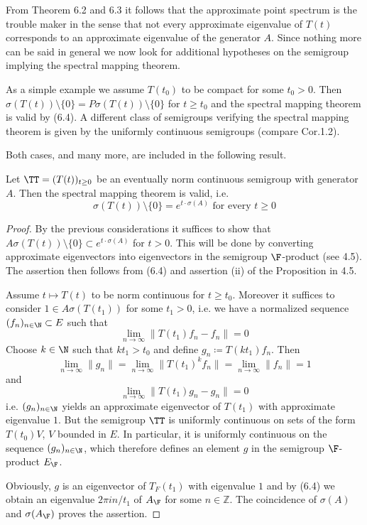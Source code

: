 From Theorem 6.2 and 6.3 it follows that the approximate point spectrum is the trouble maker in the sense that not every approximate eigenvalue of $T(t)$ corresponds to an approximate eigenvalue of the generator $A$.
Since nothing more can be said in general we now look for additional hypotheses on the semigroup implying the spectral mapping theorem.

As a simple example we assume $T(t_{0})$ to be compact for some $t_{0} > 0$.
Then $\sigma(T(t)) \setminus \{0\} = P\sigma(T(t)) \setminus \{0\}$ for $t \geq t_{0}$ and the spectral mapping theorem is valid by (6.4).
A different class of semigroups verifying the spectral mapping theorem is given by the uniformly continuous semigroups (compare Cor.1.2).

Both cases, and many more, are included in the following result.


\begin{theorem}\label{thm:a3-6.6}
Let $\TT = (T(t))_{t\geq 0}$ be an eventually norm continuous semigroup with generator $A$.
Then the spectral mapping theorem is valid, i.e.
\[
\sigma(T(t)) \setminus \{0\} = e^{t \cdot \sigma(A)} \text{ for every } t \geq 0
\]
\end{theorem}

\begin{proof}
By the previous considerations it suffices to show that $A\sigma(T(t)) \setminus \{0\} \subset e^{t \cdot \sigma(A)}$ for $t > 0$.
This will be done by converting approximate eigenvectors into eigenvectors in the semigroup $\F$-product (see 4.5).
The assertion then follows from (6.4) and assertion (ii) of the Proposition in 4.5.

Assume $t \mapsto T(t)$ to be norm continuous for $t \geq t_{0}$.
Moreover it suffices to consider $1 \in A\sigma(T(t_{1}))$ for some $t_{1} > 0$, i.e. we have a normalized sequence $(f_{n})_{n\in\N} \subset E$ such that
\[
\lim_{n\to\infty} \|T(t_{1})f_{n} - f_{n}\| = 0
\]
Choose $k \in \N$ such that $kt_{1} > t_{0}$ and define $g_{n} \coloneqq T(kt_{1})f_{n}$.
Then
\[
\lim_{n\to\infty}\|g_{n}\| = \lim_{n\to\infty}\|T(t_{1})^{k}f_{n}\| = \lim_{n\to\infty}\|f_{n}\| = 1
\]
and
\[
\lim_{n\to\infty} \|T(t_{1})g_{n} - g_{n}\| = 0
\]
i.e. $(g_{n})_{n\in\N}$ yields an approximate eigenvector of $T(t_{1})$ with approximate eigenvalue $1$.
But the semigroup $\TT$ is uniformly continuous on sets of the form $T(t_{0})V$, $V$ bounded in $E$.
In particular, it is uniformly continuous on the sequence $(g_{n})_{n\in\N}$, which therefore defines an element $g$ in the semigroup $\F$-product $E_{\F}$.

Obviously, $g$ is an eigenvector of $T_{F}(t_{1})$ with eigenvalue $1$ and by (6.4) we obtain an eigenvalue $2\pi i n/t_{1}$ of $A_{\F}$ for some $n \in \mathbb{Z}$.
The coincidence of $\sigma(A)$ and $\sigma(A_{\F})$ proves the assertion.
\end{proof}

